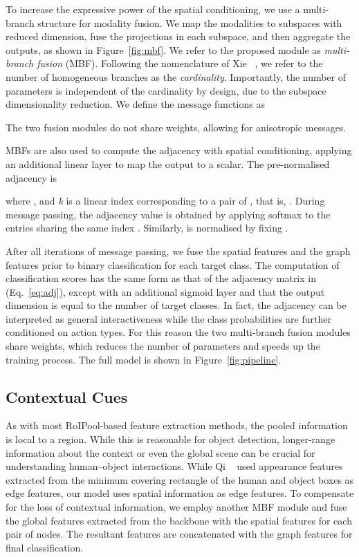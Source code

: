 \documentclass[10pt,twocolumn,letterpaper]{article}
\begin{document}
To increase the expressive power of the spatial conditioning, we use a multi-branch structure for modality fusion. We map the modalities to  subspaces with reduced dimension, fuse the projections in each subspace, and then aggregate the outputs, as shown in Figure~\ref{fig:mbf}.
We refer to the proposed module as \textit{multi-branch fusion} (MBF). Following the nomenclature of Xie \etal~\cite{xie2017}, we refer to the number of homogeneous branches as the \textit{cardinality}.
Importantly, the number of parameters is independent of the cardinality by design, due to the subspace dimensionality reduction.
We define the message functions as

The two fusion modules do not share weights, allowing for anisotropic messages.


MBFs are also used to compute the adjacency with spatial conditioning, applying an additional linear layer to map the output to a scalar. The pre-normalised adjacency is

where ,  and \textit{k} is a linear index corresponding to a pair of , that is, . During message passing, the adjacency value  is obtained by applying softmax to the entries sharing the same index . Similarly,  is normalised by fixing .

After all iterations of message passing, we fuse the spatial features and the graph features prior to binary classification for each target class. The computation of classification scores has the same form as that of the adjacency matrix in (Eq.~\ref{eq:adj}), except with an additional sigmoid layer and that the output dimension is equal to the number of target classes. In fact, the adjacency can be interpreted as general interactiveness while the class probabilities are further conditioned on action types. For this reason the two multi-branch fusion modules share weights, which reduces the number of parameters and speeds up the training process. The full model is shown in Figure~\ref{fig:pipeline}.

\subsection{Contextual Cues}

As with most RoIPool-based feature extraction methods, the pooled information is local to a region. While this is reasonable for object detection, longer-range information about the context or even the global scene can be crucial for understanding human--object interactions. While Qi \etal~\cite{qi2018} used appearance features extracted from the minimum covering rectangle of the human and object boxes as edge features, our model uses spatial information as edge features. To compensate for the loss of contextual information, we employ another MBF module and fuse the global features extracted from the backbone with the spatial features for each pair of nodes. The resultant features are concatenated with the graph features for final classification.
\end{document}
